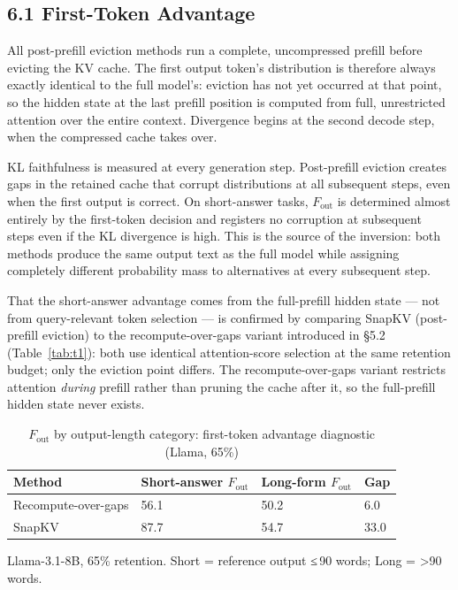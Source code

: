 \documentclass[10pt,letterpaper]{article}
\begin{document}
\hypertarget{first-token-advantage}{%
\subsection{6.1 First-Token Advantage}\label{first-token-advantage}}

All post-prefill eviction methods
run a complete, uncompressed prefill before evicting the KV cache. The
first output token's distribution is therefore always exactly identical
to the full model's: eviction has not yet occurred at that point, so the
hidden state at the last prefill position is computed from full,
unrestricted attention over the entire context. Divergence begins at the
second decode step, when the compressed cache takes over. 

KL faithfulness is measured at every generation step. Post-prefill
eviction creates gaps in the retained cache that corrupt distributions
at all subsequent steps, even when the first output is correct. On
short-answer tasks, \(F_{\text{out}}\) is determined almost entirely by
the first-token decision and registers no corruption at subsequent
steps even if the KL divergence is high. This is the source of the 
inversion: both methods produce the
same output text as the full model while assigning completely different
probability mass to alternatives at every subsequent step.

That the short-answer advantage comes
from the full-prefill hidden state --- not from query-relevant token
selection --- is confirmed by comparing SnapKV
(post-prefill eviction) to the recompute-over-gaps variant
introduced in §5.2 (Table~\ref{tab:t1}): both use identical
attention-score selection at the same retention budget; only the
eviction point differs. The recompute-over-gaps variant restricts
attention \emph{during} prefill rather than pruning the cache after it,
so the full-prefill hidden state never exists. 

\begin{table}[H]
\centering
\small
\caption{\(F_{\text{out}}\) by output-length category: first-token advantage diagnostic (Llama, 65\%)}
\label{tab:rog}
\begin{tabular}{@{}llll@{}}
\toprule
Method & Short-answer \(F_{\text{out}}\) & Long-form \(F_{\text{out}}\) & Gap\\
\midrule
Recompute-over-gaps & 56.1 & 50.2 & 6.0\\
SnapKV              & 87.7 & 54.7 & 33.0\\
\bottomrule
\end{tabular}

\center Llama-3.1-8B, 65\% retention. Short = reference output ≤\,90 words; Long = \textgreater{}90 words.
\end{table}
\end{document}
